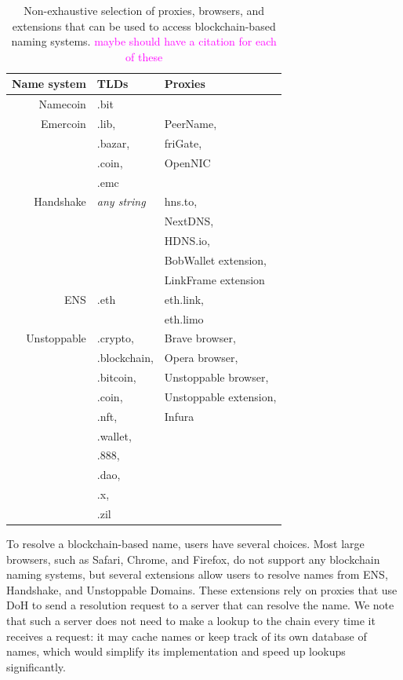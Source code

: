 \documentclass[10pt,sigconf,letterpaper]{acmart}
\newcommand{\randall}{\ding{110}\ding{43}\textcolor{magenta}}
\newcommand{\randall}{}
\begin{document}
\begin{table}
	\begin{tabular}{r l l}
		\toprule
		Name system & TLDs & Proxies \\
		\midrule
		Namecoin & .bit & \\
		Emercoin & .lib, & PeerName,  \\
		& .bazar, & friGate, \\
		& .coin, & OpenNIC \\
		& .emc & \\
		Handshake & \emph{any string} & hns.to, \\
		& & NextDNS, \\
		& & HDNS.io,\\
		& & BobWallet extension, \\
		& & LinkFrame extension \\
		ENS & .eth & eth.link, \\
		& & eth.limo \\
		Unstoppable & .crypto, & Brave browser, \\
		& .blockchain, & Opera browser, \\
		& .bitcoin, & Unstoppable browser, \\
		& .coin, & Unstoppable extension, \\
		& .nft, & Infura\\
		& .wallet, & \\
		& .888, & \\
		& .dao, & \\
		& .x, & \\
		& .zil & \\
		\bottomrule
	\end{tabular}
	\caption{Non-exhaustive selection of proxies, browsers, 
	and extensions 
	that can be used to access blockchain-based naming 
	systems. \randall{maybe should have a citation for each 
	of these}}
	\label{tab:proxies_and_tlds}
\end{table}

To resolve a blockchain-based name, users have several choices. Most large 
browsers, such as Safari, Chrome, and Firefox, do not support any blockchain 
naming systems, but several extensions allow users to resolve names from ENS, 
Handshake, and Unstoppable Domains. These extensions rely on proxies that use 
DoH to send a resolution request to a server that can resolve the name. We 
note that such a server does not need to make a lookup to the chain every time 
it receives a request: it may cache names or keep track of its own database of 
names, which would simplify its implementation and speed up lookups 
significantly. 
\end{document}
